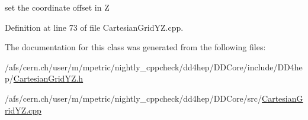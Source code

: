 set the coordinate offset in Z 



Definition at line 73 of file Cartesian\+Grid\+Y\+Z.\+cpp.



The documentation for this class was generated from the following files\+:\begin{DoxyCompactItemize}
\item 
/afs/cern.\+ch/user/m/mpetric/nightly\+\_\+cppcheck/dd4hep/\+D\+D\+Core/include/\+D\+D4hep/\hyperlink{_d_d_core_2include_2_d_d4hep_2_cartesian_grid_y_z_8h}{Cartesian\+Grid\+Y\+Z.\+h}\item 
/afs/cern.\+ch/user/m/mpetric/nightly\+\_\+cppcheck/dd4hep/\+D\+D\+Core/src/\hyperlink{_d_d_core_2src_2_cartesian_grid_y_z_8cpp}{Cartesian\+Grid\+Y\+Z.\+cpp}\end{DoxyCompactItemize}
